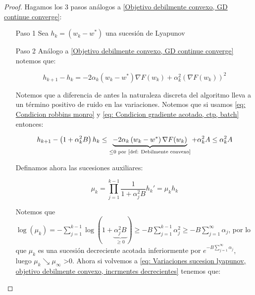 \begin{proof}
	Hagamos los 3 pasos an\'alogos a \ref{Objetivo debilmente convexo, GD continue converge}:
	
	\begin{enumerate}
		\item [Paso 1] Sea $h_k = \left(w_k - w^*\right)$ una sucesi\'on de Lyapunov
		\item [Paso 2] An\'alogo a \ref{Objetivo debilmente convexo, GD continue converge} notemos que:
		
		\begin{equation*}
			h_{k+1} - h_k = -2 \alpha_k \left(w_k - w^* \right)\nabla F(w_k) + \alpha_k^2 (\nabla F(w_k))^2
		\end{equation*}
		
		Notemos que a diferencia de antes la naturaleza discreta del algoritmo lleva a un t\'ermino positivo de ruido en las variaciones. Notemos que si usamos \ref{eq: Condicion robbins monro} y \ref{eq: Condicion gradiente acotado, ctp, batch} entonces:
		
		\begin{equation*}
		\label{eq: Variaciones sucesion lyapunov, objetivo debilmente convexo, incrmentes decrecientes}
			h_{k+1} - \left(1 + \alpha_k^2 B\right)h_k \leq \underbrace{-2 \alpha_k \left(w_k - w^* \right)\nabla F(w_k)}_{\leq 0 \text{ por \ref{def: Debilmente convexo}}} + \alpha_k^2A \leq \alpha_k^2A 
		\end{equation*}
		
		Definamos ahora las sucesiones auxiliares:
		
		\begin{subequations}
			\begin{equation}
				\mu_k = \prod\limits_{j=1}^{k-1} {\dfrac{1}{1 + \alpha_j^2B}}
			\end{equation}
			\begin{equation}
				h_k' = \mu_k h_k
			\end{equation}
		\end{subequations}
		
		Notemos que $\log (\mu_k) = - \sum\limits_{j=1}^{k-1} {\log \left(1 + \underbrace{\alpha_j^2 B}_{\geq 0}\right)} \geq - B\sum\limits_{j=1}^{k-1} {\alpha_j^2} \geq -B \sum\limits_{j=1}^{\infty} {\alpha_j}$, por lo que $\mu_k$ es una sucesi\'on decreciente acotada inferiormente por $e^{-B \sum\limits_{j=1}^{\infty} {\alpha_j}}$, luego $\mu_k \searrow \mu_{\infty}$ >0. Ahora si volvemos  a \ref{eq: Variaciones sucesion lyapunov, objetivo debilmente convexo, incrmentes decrecientes} tenemos que:
		

\end{enumerate}
\end{proof}
